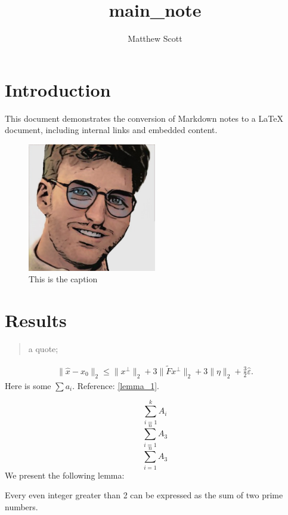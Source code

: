 \documentclass{article}
\title{main\_note}
\author{Matthew Scott}
\begin{document}
\maketitle
{}
\section{Introduction}
\label{introduction}
This document demonstrates the conversion of Markdown notes to a LaTeX document, including internal links and embedded content.

\begin{figure}[h]
  \centering
  \includegraphics[width=0.5\textwidth]{Files/download.jpeg}
  \caption{This is the caption}
\end{figure}
\section{Results}
\label{results}


\begin{quote}
  a quote;

\end{quote}
\begin{align*}
  \|\hat x - x_0\|_2
  \leq \|x^\perp\|_2 + 3\|\tilde{F}x^\perp\|_2 + 3 \|\eta\|_2 + \frac{3}{2}\hat\varepsilon.
\end{align*}
Here is some $\sum a_i$. Reference: \autoref{lemma_1}.

$$\sum_{i=1}^k A_i$$
$$\sum_{i=1}^n A_3$$
$$\sum_{i=1}^n A_3$$
We present the following lemma:

\begin{lemma}
  \label{lemma_1}
  Every even integer greater than 2 can be expressed as the sum of two prime numbers.

\end{lemma}
\end{document}
